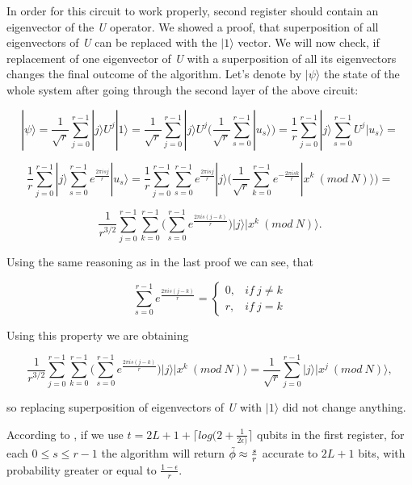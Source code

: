 In order for this circuit to work properly, second register should contain an eigenvector of the \textit{U} operator. We showed a proof, that superposition of all eigenvectors of \textit{U} can be replaced with the $|1\rangle$ vector. We will now check, if replacement of one eigenvector of \textit{U} with a superposition of all its eigenvectors changes the final outcome of the algorithm. Let's denote by $|\psi\rangle$ the state of the whole system after going through the second layer of the above circuit:

\[ |\psi\rangle = \frac{1}{\sqrt{r}} \sum_{j = 0}^{r - 1}|j\rangle U^j|1\rangle = \frac{1}{\sqrt{r}}\sum_{j = 0}^{r - 1}|j\rangle U^j\bigg( \frac{1}{\sqrt{r}} \sum_{s = 0}^{r - 1} |u_s\rangle \bigg) = \frac{1}{r} \sum_{j = 0}^{r - 1} |j\rangle \sum_{s = 0}^{r - 1}U^j|u_s\rangle =  \]

\[ \frac{1}{r} \sum_{j = 0}^{r - 1} |j\rangle \sum_{s = 0}^{r - 1} e^{\frac{2 \pi i s j}{r}}|u_s\rangle = \frac{1}{r} \sum_{j = 0}^{r - 1} \sum_{s = 0}^{r - 1} e^{\frac{2 \pi i s j}{r}}|j\rangle \bigg( \frac{1}{\sqrt{r}} \sum_{k = 0}^{r - 1} e^{-\frac{2 \pi i s k}{r}} |x^k\ (mod\ N)\rangle \bigg) = \]

\[ \frac{1}{r^{3/2}} \sum_{j = 0}^{r - 1} \sum_{k = 0}^{r - 1} \bigg( \sum_{s = 0}^{r - 1} e^{\frac{2 \pi i s (j - k)}{r}}\bigg) |j\rangle |x^k\ (mod\ N)\rangle. \]

Using the same reasoning as in the last proof we can see, that

\[ \sum_{s = 0}^{r - 1} e^{\frac{2 \pi i s (j - k)}{r}} = \begin{cases}  
0, & if\ j \neq k \\
r, & if\ j = k
\end{cases} \]

Using this property we are obtaining

\[ \frac{1}{r^{3/2}} \sum_{j = 0}^{r - 1} \sum_{k = 0}^{r - 1} \bigg( \sum_{s = 0}^{r - 1} e^{\frac{2 \pi i s (j - k)}{r}}\bigg) |j\rangle |x^k\ (mod\ N)\rangle = \frac{1}{\sqrt{r}} \sum_{j = 0}^{r - 1} |j\rangle |x^j\ (mod\ N)\rangle,\]

so replacing superposition of eigenvectors of \textit{U} with $|1\rangle$ did not change anything.

According to \cite{nielsen_chuang}, if we use $t = 2L + 1 + \lceil log(2 + \frac{1}{2\epsilon)} \rceil$ qubits in the first register, for each $0 \leq s \leq r - 1$ the algorithm will return $\Tilde{\phi} \approx \frac{s}{r}$ accurate to $2L + 1$ bits, with probability greater or equal to $\frac{1 - \epsilon}{r}$.

